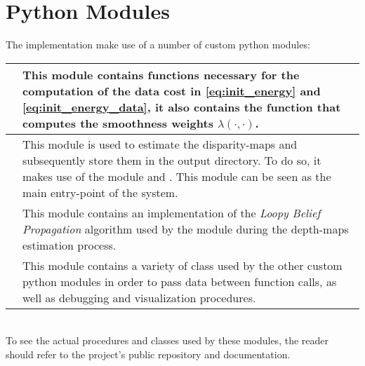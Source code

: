 \section{Python Modules}
The implementation make use of a number of custom python modules:

{
\centering
\begin{tabular}{p{} p{}}
	\hline\hline
	\ComputeEnergy& 
	This module contains functions necessary for the computation of the data cost in \cref{eq:init_energy} and \cref{eq:init_energy_data}, it also contains the function that computes the smoothness weights $\lambda(\cdot,\cdot)$.\\\hline
	\Estimate& 
	This module is used to estimate the disparity-maps and subsequently store them in the output directory. To do so, it makes use of the module \ComputeEnergy{} and \Lbp. This module can be seen as the main entry-point of the system.\\\hline
	\Lbp&
	This module contains an implementation of the \emph{Loopy Belief Propagation} algorithm used by the \Estimate{} module during the depth-maps estimation process.\\\hline
	\Utils&
	This module contains a variety of class used by the other custom python modules in order to pass data between function calls, as well as debugging and visualization procedures.\\
	\hline\hline
\end{tabular}
}\\

To see the actual procedures and classes used by these modules, the reader should refer to the project's public repository \ProjectUrl{} and documentation.   







